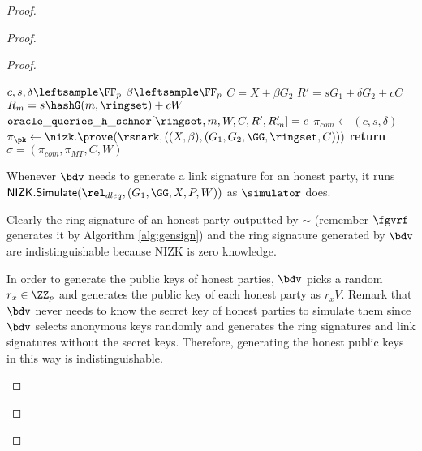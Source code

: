 \begin{proof}
\begin{proof}
\begin{proof}
			
			\begin{algorithm}
				\caption{$\Gen_{sign}(\ringset,W,X,m)$}
				\label{alg:gensignbdv}	 	
				\begin{algorithmic}[1]
					\State $ c,s,\delta \leftsample \FF_p $
					\State $ \beta \leftsample \FF_p $
					\State $ C =  X + \beta G_2$
					\State $ R' = sG_1 +\delta G_2 + cC$
					\State $ R_m = s\hashG(m, \ringset) + c W $
					\State $ \mathtt{oracle\_queries\_h\_schnor}[\ringset,m, W, C,R',R'_m] = c$						
					\State $ \pi_{com} \leftarrow (c,s,\delta) $
					\State $ \pi_{\pk} \leftarrow  \nizk.\prove(\rsnark,((X, \beta),(G_1,G_2, \GG,\ringset, C))) $
					\State \textbf{return} $ \sigma = (\pi_{com},\pi_{MT},C,W) $
				\end{algorithmic}
				
			\end{algorithm}
			
			Whenever $ \bdv $ needs to generate a link signature for an honest party, it runs $ \mathsf{NIZK}.\mathsf{Simulate}(\rel_{dleq},(G_1,\GG, X,P,W)) $ as $ \simulator $ does.
			
			Clearly the ring signature of an honest party outputted by $ \sim $ (remember $ \fgvrf$ generates it by Algorithm \ref{alg:gensign}) and the ring signature generated by $ \bdv $ are indistinguishable because NIZK is zero knowledge.
			
			In order to generate the public keys of honest parties, $ \bdv $ picks a random $ r_x\in \ZZ_p $ and generates the public key of each honest party as $ r_xV$.
			Remark that $ \bdv$  never needs to know the secret key of honest parties to simulate them since $ \bdv $ selects anonymous keys randomly  and generates the ring signatures and link signatures  without the secret keys. Therefore, generating the honest public keys in this way is indistinguishable. 			
			\begin{figure}
				\centering
				
				\noindent{}
\end{figure}
\end{proof}
\end{proof}
\end{proof}
